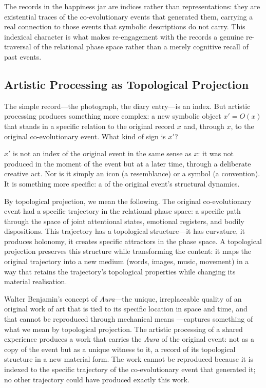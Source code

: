 \begin{claim}
The records in the happiness jar are indices rather than representations: they are existential traces of the co-evolutionary events that generated them, carrying a real connection to those events that symbolic descriptions do not carry. This indexical character is what makes re-engagement with the records a genuine re-traversal of the relational phase space rather than a merely cognitive recall of past events.
\end{claim}

\subsection{Artistic Processing as Topological Projection}
\label{p15:subsec:projection}

\noindent
The simple record---the photograph, the diary entry---is an index. But artistic processing produces something more complex: a new symbolic object $x' = O(x)$ that stands in a specific relation to the original record $x$ and, through $x$, to the original co-evolutionary event. What kind of sign is $x'$?

$x'$ is not an index of the original event in the same sense as $x$: it was not produced in the moment of the event but at a later time, through a deliberate creative act. Nor is it simply an icon (a resemblance) or a symbol (a convention). It is something more specific: a  of the original event's structural dynamics.

By topological projection, we mean the following. The original co-evolutionary event had a specific trajectory in the relational phase space: a specific path through the space of joint attentional states, emotional registers, and bodily dispositions. This trajectory has a topological structure---it has curvature, it produces holonomy, it creates specific attractors in the phase space. A topological projection preserves this structure while transforming the content: it maps the original trajectory into a new medium (words, images, music, movement) in a way that retains the trajectory's topological properties while changing its material realisation.

Walter Benjamin's concept of \emph{Aura}---the unique, irreplaceable quality of an original work of art that is tied to its specific location in space and time, and that cannot be reproduced through mechanical means \parencite{benjamin1968}---captures something of what we mean by topological projection. The artistic processing of a shared experience produces a work that carries the \emph{Aura} of the original event: not as a copy of the event but as a unique witness to it, a record of its topological structure in a new material form. The work cannot be reproduced because it is indexed to the specific trajectory of the co-evolutionary event that generated it; no other trajectory could have produced exactly this work.

